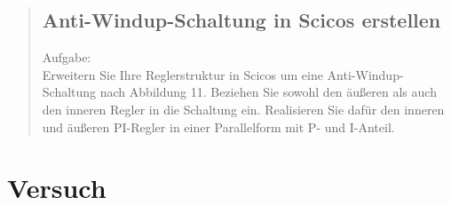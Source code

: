 \begin{quote}
\begin{quote}
	\end{quote}
	
	\subsection{Anti-Windup-Schaltung in Scicos erstellen}
	Aufgabe:\\
    Erweitern Sie Ihre Reglerstruktur in Scicos um eine Anti-Windup-Schaltung nach Abbildung 11. Beziehen Sie sowohl
    den äußeren als auch den inneren Regler in die Schaltung ein. Realisieren Sie dafür den inneren und äußeren
    PI-Regler in einer Parallelform mit P- und I-Anteil.
	\begin{quote}
		
		
	\end{quote}
	
\end{quote}


\section{Versuch}
\begin{quote}
    
\end{quote}


